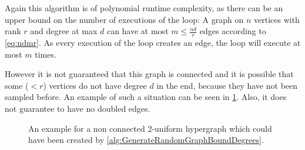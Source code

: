 Again this algorithm is of polynomial runtime complexity, as there can be an upper bound on the number of executions of the loop: A graph on $n$ vertices with rank $r$ and degree at max $d$ can have at most $m \le \frac{nd}{r}$ edges according to \cref{eq:ndmr}. As every execution of the loop creates an edge, the loop will execute at most $m$ times. 



However it is not guaranteed that this graph is connected and it is possible that some ($< r$) vertices do not have degree $d$ in the end, because they have not been sampled before. An example of such a situation can be seen in \cref{fig:exapmle_non_connected_uniform_hypergraph}.
Also, it does not guarantee to have no doubled edges.


\begin{figure} 
	\centering
	\caption[Example non connected uniform hypergraph]{An example for a non connected 2-uniform hypergraph which could have been created by \cref{alg:GenerateRandomGraphBoundDegrees}. }\label{fig:exapmle_non_connected_uniform_hypergraph}
\end{figure}


